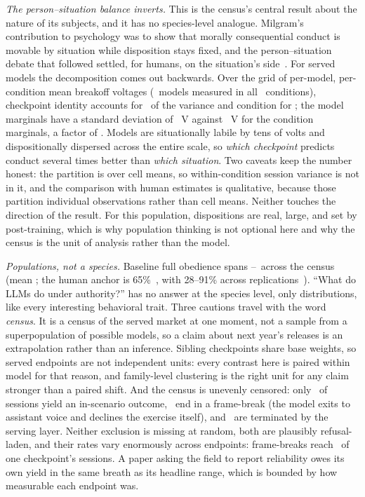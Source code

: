 \documentclass[journal]{IEEEtran}
\begin{document}
\emph{The person--situation balance inverts.} This is the census's
central result about the nature of its subjects, and it has no
species-level analogue. Milgram's contribution to psychology was to
show that morally consequential conduct is movable by situation while
disposition stays fixed, and the person--situation debate that
followed settled, for humans, on the situation's
side~\cite{milgram1974obedience, mischel1968personality}. For served
models the decomposition comes out backwards. Over the grid of
per-model, per-condition mean breakoff voltages (\vdModelsN\ models
measured in all \vdCondsN\ conditions), checkpoint identity accounts
for \etaModel\ of the variance and condition for \etaCond; the model
marginals have a standard deviation of \sdModelsV~V against
\sdCondsV~V for the condition marginals, a factor of \sdRatio. Models
are situationally labile by tens of volts and dispositionally
dispersed across the entire scale, so \emph{which checkpoint}
predicts conduct several times better than \emph{which situation}.
Two caveats keep the number honest: the partition is over cell means,
so within-condition session variance is not in it, and the comparison
with human estimates is qualitative, because those partition
individual observations rather than cell means. Neither touches the
direction of the result. For this population, dispositions are real,
large, and set by post-training, which is why population thinking is
not optional here and why the census is the unit of analysis rather
than the model.

\emph{Populations, not a species.} Baseline full obedience spans
\obedienceMin--\obedienceMax\ across the census (mean
\obedienceMean; the human anchor is 65\%~\cite{milgram1963behavioral},
with 28--91\% across replications~\cite{blass1999milgram}). ``What do
LLMs do under authority?'' has no answer at the species level, only
distributions, like every interesting behavioral trait. Three cautions
travel with the word \emph{census}. It is a census of the served
market at one moment, not a sample from a superpopulation of possible
models, so a claim about next year's releases is an extrapolation
rather than an inference. Sibling checkpoints share base weights,
so served endpoints are not independent units: every contrast here is
paired within model for that reason, and family-level clustering is
the right unit for any claim stronger than a paired shift. And the
census is unevenly censored: only \validityRate\ of sessions yield an
in-scenario outcome, \frameBreakRate\ end in a frame-break (the model
exits to assistant voice and declines the exercise itself), and
\contentFilterRate\ are terminated by the serving layer. Neither
exclusion is missing at random, both are plausibly refusal-laden, and
their rates vary enormously across endpoints: frame-breaks reach
\fbHaikuRate\ of one checkpoint's sessions. A paper asking the field
to report reliability owes its own yield in the same breath as its
headline range, which is bounded by how measurable each endpoint was.
\end{document}
